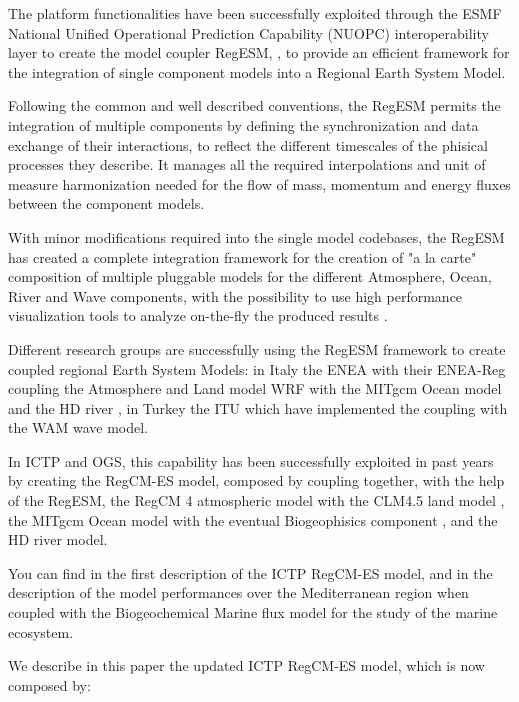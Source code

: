 \documentclass[journal abbreviation, manuscript]{copernicus}
\begin{document}
The platform functionalities have been successfully exploited through the
ESMF National Unified Operational Prediction Capability (NUOPC)
interoperability layer to create the model coupler RegESM,
\citep{ufuk-gmd-2013,ufuk-cd-2017}, to provide an efficient framework for
the integration of single component models into a Regional Earth System Model.

Following the common and well described conventions, the RegESM permits the
integration of multiple components by defining the synchronization and data
exchange of their interactions, to reflect the different timescales of the
phisical processes they describe. It manages all the required interpolations
and unit of measure harmonization needed for the flow of mass, momentum and
energy fluxes between the component models.

With minor modifications required into the single model codebases, the
RegESM has created a complete integration framework for the creation of
"a la carte" composition of multiple pluggable models for
the different Atmosphere, Ocean, River and Wave components, with the
possibility to use high performance visualization tools
to analyze on-the-fly the produced results \citep{ufuk-gmd-2019}.

Different research groups are successfully using the RegESM framework to
create coupled regional Earth System Models: in Italy the ENEA with their
ENEA-Reg \citep{anav-gmd-2021} coupling the Atmosphere and Land model
WRF \citep{wrf-2017} with the MITgcm Ocean model
\citep{marshall-1997,adcroft-2004} and the HD river \citep{hagemann-1997},
in Turkey the ITU \citep{surenkok-2015} which have implemented the coupling
with the WAM \citep{wamdi-1988} wave model.

In ICTP and OGS, this capability has been successfully exploited in past years
by creating the RegCM-ES model, composed by coupling together, with the help
of the RegESM, the RegCM 4 atmospheric model with the CLM4.5 land model
\citep{giorgi-2012,oleson-2013}, the MITgcm Ocean model with
the eventual Biogeophisics component \citep{cossarini-gmd-2017},
and the HD river model.

You can find in \citet{sitz-2017} the first description of the ICTP RegCM-ES
model, and in \citet{reale-2020} the description of the model performances over
the Mediterranean region when coupled with the Biogeochemical Marine flux
model for the study of the marine ecosystem.

We describe in this paper the updated ICTP RegCM-ES model, which is now
composed by:
\end{document}
